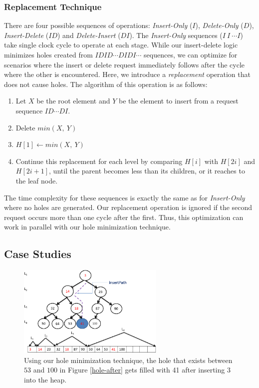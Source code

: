 \subsubsection{Replacement Technique}
There are four possible sequences of operations: {\it Insert-Only} ($I$), {\it Delete-Only} ($D$), {\it Insert-Delete} ($ID$) and {\it Delete-Insert} ($DI$).
The {\it Insert-Only} sequences ($I \ I \ \cdots I $) take single clock cycle to operate at each stage.
While our insert-delete logic minimizes holes created from $IDID \cdots DIDI \cdots$ sequences, we can optimize for scenarios where the insert or delete request immediately follows after the cycle where the other is encountered.
Here, we introduce a {\it replacement} operation that does not cause holes.
The algorithm of this operation is as follows:
 \begin{enumerate}
 \item Let $X$ be the root element and $Y$ be the element to insert from a request sequence $ID \cdots DI$.
 \item Delete $min(X, \ Y)$
 \item $H[1] \leftarrow min(X,\ Y)$
 \item Continue this replacement for each level by comparing $H[i]$ with $H[2i]$ and $H[2i+1]$, until the parent becomes less than its children, or it reaches to the leaf node.
 \end{enumerate}
The time complexity for these sequences is exactly the same as for {\it Insert-Only} where no holes are generated.
Our replacement operation is ignored if the second request occurs more than one cycle after the first.
Thus, this optimization can work in parallel with our hole minimization technique.


\subsection{Case Studies}

\begin{figure}[!ht]
  \centering
  \includegraphics[width=7cm]{fig/fillhole.png}
      \caption{Using our hole minimization technique, the hole that exists between $53$ and $100$ in Figure \ref{hole-after} gets filled with 41 after inserting $3$ into the heap.}
    \label{fillhole}
\end{figure}

